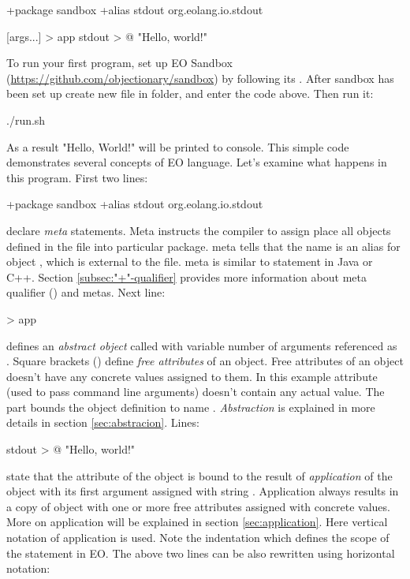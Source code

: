 \documentclass[12pt]{book}
\begin{document}
\begin{ffcode}
+package sandbox
+alias stdout org.eolang.io.stdout

[args...] > app
  stdout > @
    "Hello, world!\n"

\end{ffcode}

To run your first program, set up EO Sandbox (\url{https://github.com/objectionary/sandbox}) by following its . After sandbox has been set up create new file  in  folder, and enter the code above. Then run it:

\begin{ffcode}
./run.sh
\end{ffcode}

As a result "Hello, World!" will be printed to console. This simple code demonstrates several concepts of EO language. Let’s examine what happens in this program. First two lines:
\begin{ffcode}
+package sandbox
+alias stdout org.eolang.io.stdout
\end{ffcode}
declare \textit{meta} statements. Meta  instructs the compiler to assign place all objects defined in the file into particular package.  meta tells that the name  is an alias for object , which is external to the file.  meta is similar to  statement in Java or C++. Section \ref{subsec:"+"-qualifier} provides more information about meta qualifier (\ff{+}) and metas. Next line:
\begin{ffcode}
[args...] > app
\end{ffcode}
defines an \textit{abstract object} called  with variable number of arguments referenced as . Square brackets (\ff{[]}) define \textit{free attributes} of an object. Free attributes of an object doesn't have any concrete values assigned to them. In this example attribute  (used to pass command line arguments) doesn't contain any actual value. The  part bounds the object definition to name . \textit{Abstraction} is explained in more details in section \ref{sec:abstracion}. Lines:
\begin{ffcode}
stdout > @
  "Hello, world!\n"
\end{ffcode}
state that the attribute  of the object is bound to the result of \textit{application} of the object  with its first argument assigned with string . Application always results in a copy of object with one or more free attributes assigned with concrete values. More on application will be explained in section \ref{sec:application}. Here vertical notation of application is used. Note the indentation which defines the scope of the statement in EO. The above two lines can be also rewritten using horizontal notation:
\end{document}
